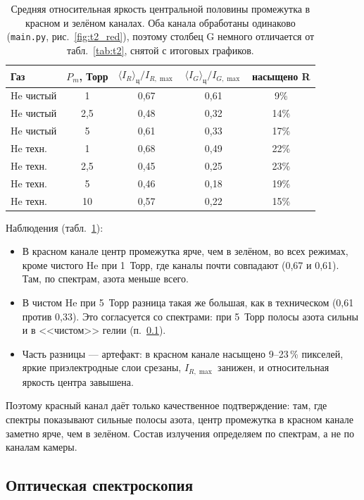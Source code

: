 \documentclass[12pt,a4paper]{article}
\begin{document}
\begin{table}[H]
  \centering
  \caption{Средняя относительная яркость центральной половины промежутка
  в красном и зелёном каналах. Оба канала обработаны одинаково
  (\texttt{main.py}, рис.~\ref{fig:t2_red}), поэтому столбец G немного
  отличается от табл.~\ref{tab:t2}, снятой с итоговых графиков.}
  \label{tab:red}
  \begin{tabular}{lcccc}
    \toprule
    Газ & $P_m$, Торр & $\langle I_R\rangle_\text{ц}/I_{R,\max}$ &
    $\langle I_G\rangle_\text{ц}/I_{G,\max}$ & насыщено R \\
    \midrule
    He чистый & 1   & 0,67 & 0,61 & 9\% \\
    He чистый & 2,5 & 0,48 & 0,32 & 14\% \\
    He чистый & 5   & 0,61 & 0,33 & 17\% \\
    \midrule
    He техн.  & 1   & 0,68 & 0,49 & 22\% \\
    He техн.  & 2,5 & 0,45 & 0,25 & 23\% \\
    He техн.  & 5   & 0,46 & 0,18 & 19\% \\
    He техн.  & 10  & 0,57 & 0,22 & 15\% \\
    \bottomrule
  \end{tabular}
\end{table}

Наблюдения (табл.~\ref{tab:red}):
\begin{itemize}
  \item В красном канале центр промежутка ярче, чем в зелёном, во всех
        режимах, кроме чистого He при 1~Торр, где каналы почти совпадают
        (0,67 и 0,61). Там, по спектрам, азота меньше всего.
  \item В чистом He при 5~Торр разница такая же большая, как в
        техническом (0,61 против 0,33). Это согласуется со спектрами: при
        5~Торр полосы азота сильны и в <<чистом>> гелии
        (п.~\ref{sec:spectra}).
  \item Часть разницы --- артефакт: в красном канале насыщено 9--23\,\%
        пикселей, яркие приэлектродные слои срезаны, $I_{R,\max}$
        занижен, и относительная яркость центра завышена.
\end{itemize}
Поэтому красный канал даёт только качественное подтверждение: там, где
спектры показывают сильные полосы азота, центр промежутка в красном
канале заметно ярче, чем в зелёном. Состав излучения определяем по
спектрам, а не по каналам камеры.

\subsection{Оптическая спектроскопия}
\label{sec:spectra}
\end{document}
